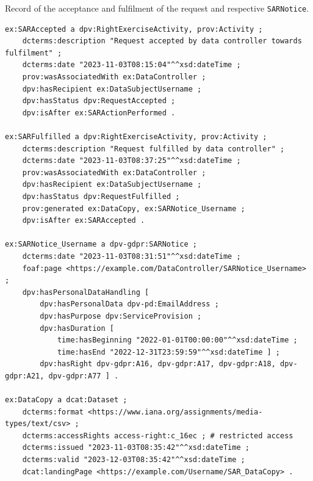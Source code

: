 \begin{listing}[htp]
\caption{Record of the acceptance and fulfilment of the request and respective \texttt{SARNotice}.}
\label{list:sar_notice}
\begin{verbatim}
ex:SARAccepted a dpv:RightExerciseActivity, prov:Activity ;
    dcterms:description "Request accepted by data controller towards fulfilment" ;
    dcterms:date "2023-11-03T08:15:04"^^xsd:dateTime ;
    prov:wasAssociatedWith ex:DataController ;
    dpv:hasRecipient ex:DataSubjectUsername ;
    dpv:hasStatus dpv:RequestAccepted ;
    dpv:isAfter ex:SARActionPerformed .

ex:SARFulfilled a dpv:RightExerciseActivity, prov:Activity ;
    dcterms:description "Request fulfilled by data controller" ;
    dcterms:date "2023-11-03T08:37:25"^^xsd:dateTime ;
    prov:wasAssociatedWith ex:DataController ;
    dpv:hasRecipient ex:DataSubjectUsername ;
    dpv:hasStatus dpv:RequestFulfilled ;
    prov:generated ex:DataCopy, ex:SARNotice_Username ;
    dpv:isAfter ex:SARAccepted .

ex:SARNotice_Username a dpv-gdpr:SARNotice ;
    dcterms:date "2023-11-03T08:31:51"^^xsd:dateTime ;
    foaf:page <https://example.com/DataController/SARNotice_Username> ;
    dpv:hasPersonalDataHandling [
        dpv:hasPersonalData dpv-pd:EmailAddress ;
        dpv:hasPurpose dpv:ServiceProvision ;
        dpv:hasDuration [
            time:hasBeginning "2022-01-01T00:00:00"^^xsd:dateTime ;
            time:hasEnd "2022-12-31T23:59:59"^^xsd:dateTime ] ;
        dpv:hasRight dpv-gdpr:A16, dpv-gdpr:A17, dpv-gdpr:A18, dpv-gdpr:A21, dpv-gdpr:A77 ] .

ex:DataCopy a dcat:Dataset ;
    dcterms:format <https://www.iana.org/assignments/media-types/text/csv> ;
    dcterms:accessRights access-right:c_16ec ; # restricted access
    dcterms:issued "2023-11-03T08:35:42"^^xsd:dateTime ;
    dcterms:valid "2023-12-03T08:35:42"^^xsd:dateTime ;
    dcat:landingPage <https://example.com/Username/SAR_DataCopy> .
\end{verbatim}
\end{listing}

